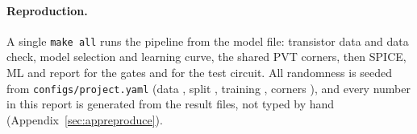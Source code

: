 \paragraph{Reproduction.}
A single \texttt{make all} runs the pipeline from the model file: transistor data and data check,
model selection and learning curve, the shared PVT corners, then SPICE, ML and report for the
gates and for the test circuit. All randomness is seeded from \texttt{configs/project.yaml}
(data \SeedTransistorData, split \SeedSplit, training \SeedTraining, corners \SeedCorners), and
every number in this report is generated from the result files, not typed by hand
(Appendix~\ref{sec:appreproduce}).
